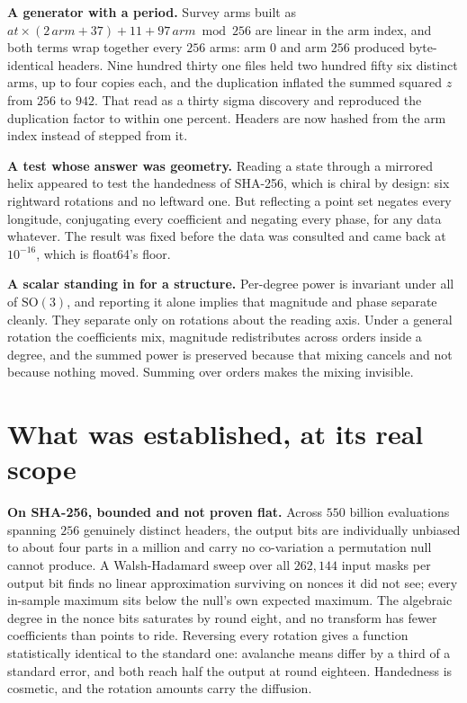 \textbf{A generator with a period.} Survey arms built as \(\mathit{at} \times (2\,\mathit{arm} + 37) + 11 + 97\,\mathit{arm} \bmod 256\) are linear in the arm index, and both terms wrap together every \(256\) arms: arm \(0\) and arm \(256\) produced byte-identical headers. Nine hundred thirty one files held two hundred fifty six distinct arms, up to four copies each, and the duplication inflated the summed squared \(z\) from \(256\) to \(942\). That read as a thirty sigma discovery and reproduced the duplication factor to within one percent. Headers are now hashed from the arm index instead of stepped from it.

\textbf{A test whose answer was geometry.} Reading a state through a mirrored helix appeared to test the handedness of SHA-256, which is chiral by design: six rightward rotations and no leftward one. But reflecting a point set negates every longitude, conjugating every coefficient and negating every phase, for any data whatever. The result was fixed before the data was consulted and came back at \(10^{-16}\), which is float64's floor.

\textbf{A scalar standing in for a structure.} Per-degree power is invariant under all of \(\mathrm{SO}(3)\), and reporting it alone implies that magnitude and phase separate cleanly. They separate only on rotations about the reading axis. Under a general rotation the coefficients mix, magnitude redistributes across orders inside a degree, and the summed power is preserved because that mixing cancels and not because nothing moved. Summing over orders makes the mixing invisible.

\section{What was established, at its real scope}

\textbf{On SHA-256, bounded and not proven flat.} Across \(550\) billion evaluations spanning \(256\) genuinely distinct headers, the output bits are individually unbiased to about four parts in a million and carry no co-variation a permutation null cannot produce. A Walsh-Hadamard sweep over all \(262{,}144\) input masks per output bit finds no linear approximation surviving on nonces it did not see; every in-sample maximum sits below the null's own expected maximum. The algebraic degree in the nonce bits saturates by round eight, and no transform has fewer coefficients than points to ride. Reversing every rotation gives a function statistically identical to the standard one: avalanche means differ by a third of a standard error, and both reach half the output at round eighteen. Handedness is cosmetic, and the rotation amounts carry the diffusion.

